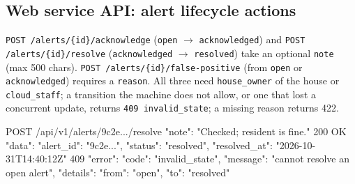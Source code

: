 \subsection{Web service API: alert lifecycle actions}
\texttt{POST /alerts/\{id\}/\allowbreak acknowledge} (\texttt{open} $\rightarrow$ \texttt{acknowledged}) and
\texttt{POST /alerts/\{id\}/\allowbreak resolve} (\texttt{acknowledged} $\rightarrow$ \texttt{resolved}) take an optional
\texttt{note} (max 500 chars). \texttt{POST /alerts/\{id\}/\allowbreak false-positive} (from \texttt{open} or
\texttt{acknowledged}) requires a \texttt{reason}. All three need \texttt{house\_owner} of the house or
\texttt{cloud\_staff}; a transition the machine does not allow, or one that lost a concurrent update, returns
\texttt{409 invalid\_state}; a missing reason returns 422.
\begin{Shaded}
\begin{Code}
POST /api/v1/alerts/9c2e.../resolve  { "note": "Checked; resident is fine." }
200 OK   { "data": { "alert_id": "9c2e...", "status": "resolved", "resolved_at": "2026-10-31T14:40:12Z" } }
409      { "error": { "code": "invalid_state", "message": "cannot resolve an open alert",
                      "details": { "from": "open", "to": "resolved" } } }
\end{Code}
\end{Shaded}

